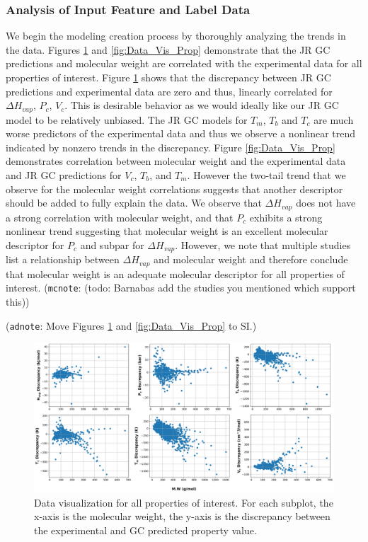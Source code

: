 \documentclass[journal=jacsat,manuscript=article]{achemso}
\newcommand{\adnote}[1]{{\color{OliveGreen} (\texttt{adnote}: #1)}}
\newcommand{\mcnote}[1]{{\color{Plum} (\texttt{mcnote}: #1)}}
\begin{document}
\subsubsection{Analysis of Input Feature and Label Data}
We begin the modeling creation process by thoroughly analyzing the trends in the data. Figures \ref{fig:Data_Vis_Disc} and \ref{fig:Data_Vis_Prop} demonstrate that the JR GC predictions and molecular weight are correlated with the experimental data for all properties of interest. Figure \ref{fig:Data_Vis_Disc} shows that the discrepancy between JR GC predictions and experimental data are zero and thus, linearly correlated for $\Delta H_{vap}$, $P_c$, $V_c$. This is desirable behavior as we would ideally like our JR GC model to be relatively unbiased. The JR GC models for $T_m$, $T_b$ and $T_c$ are much worse predictors of the experimental data and thus we observe a nonlinear trend indicated by nonzero trends in the discrepancy. Figure \ref{fig:Data_Vis_Prop} demonstrates correlation between molecular weight and the experimental data and JR GC predictions for $V_c$, $T_b$, and $T_m$. However the two-tail trend that we observe for the molecular weight correlations suggests that another descriptor should be added to fully explain the data. We observe that $\Delta H_{vap}$ does not have a strong correlation with molecular weight, and that $P_c$ exhibits a strong nonlinear trend suggesting that molecular weight is an excellent molecular descriptor for $P_c$ and subpar for $\Delta H_{vap}$. However, we note that multiple studies list a relationship between $\Delta H_{vap}$ and molecular weight and therefore conclude that molecular weight is an adequate molecular descriptor for all properties of interest. \mcnote{(todo: Barnabas add the studies you mentioned which support this)}

\adnote{Move Figures \ref{fig:Data_Vis_Disc} and \ref{fig:Data_Vis_Prop} to SI.}

\begin{figure}[H]
    \centering
    \includegraphics[width=\textwidth]{"./MW_vs_Disc.png"} %
    \caption{Data visualization for all properties of interest. For each subplot, the x-axis is the molecular weight, the y-axis is the discrepancy between the experimental and GC predicted property value.}
    \label{fig:Data_Vis_Disc}
\end{figure}
\end{document}
